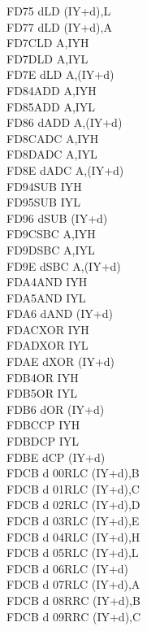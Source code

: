 \begin{multicols}{3}
{\begin{tabbing}
    FD75 d\>LD (IY+d),L\\
    FD77 d\>LD (IY+d),A\\
    FD7C\>LD A,IYH\UNDOC\\
    FD7D\>LD A,IYL\UNDOC\\
    FD7E d\>LD A,(IY+d)\\
    FD84\>ADD A,IYH\UNDOC\\
    FD85\>ADD A,IYL\UNDOC\\
    FD86 d\>ADD A,(IY+d)\\
    FD8C\>ADC A,IYH\UNDOC\\
    FD8D\>ADC A,IYL\UNDOC\\
    FD8E d\>ADC A,(IY+d)\\
    FD94\>SUB IYH\UNDOC\\
    FD95\>SUB IYL\UNDOC\\
    FD96 d\>SUB (IY+d)\\
    FD9C\>SBC A,IYH\UNDOC\\
    FD9D\>SBC A,IYL\UNDOC\\
    FD9E d\>SBC A,(IY+d)\\
    FDA4\>AND IYH\UNDOC\\
    FDA5\>AND IYL\UNDOC\\
    FDA6 d\>AND (IY+d)\\
    FDAC\>XOR IYH\UNDOC\\
    FDAD\>XOR IYL\UNDOC\\
    FDAE d\>XOR (IY+d)\\
    FDB4\>OR IYH\UNDOC\\
    FDB5\>OR IYL\UNDOC\\
    FDB6 d\>OR (IY+d)\\
    FDBC\>CP IYH\UNDOC\\
    FDBD\>CP IYL\UNDOC\\
    FDBE d\>CP (IY+d)\\
    FDCB d 00\>RLC (IY+d),B\UNDOC\\
    FDCB d 01\>RLC (IY+d),C\UNDOC\\
    FDCB d 02\>RLC (IY+d),D\UNDOC\\
    FDCB d 03\>RLC (IY+d),E\UNDOC\\
    FDCB d 04\>RLC (IY+d),H\UNDOC\\
    FDCB d 05\>RLC (IY+d),L\UNDOC\\
    FDCB d 06\>RLC (IY+d)\\
    FDCB d 07\>RLC (IY+d),A\UNDOC\\
    FDCB d 08\>RRC (IY+d),B\UNDOC\\
    FDCB d 09\>RRC (IY+d),C\UNDOC\\

\end{tabbing}}
\end{multicols}

